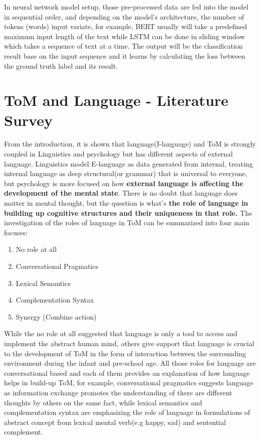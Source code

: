 \documentclass[12pt]{article}
\begin{document}
In neural network model setup, those pre-processed data are fed into the model in sequential order, and depending on the model's architecture,  the number of tokens (words) input variate, for example, BERT usually will take a predefined maximum input length of the text while LSTM can be done in sliding window which takes a sequence of text at a time. The output will be the classification result base on the input sequence and it learns by calculating the loss between the ground truth label and its result.

\newpage
\section{ToM and Language - Literature Survey} 
From the introduction, it is shown that language(I-language) and ToM is strongly coupled in Linguistics and psychology but has different aspects of external language. Linguistics model E-language as data generated from internal, treating internal language as deep structural(or grammar) that is universal to everyone, but psychology is more focused on how \textbf{external language is affecting the development of the mental state}. There is no doubt that language does matter in mental thought, but the question is what's \textbf{the role of language in building up cognitive structures and their uniqueness in that role\cite{Astington_2005}.} The investigation of the roles of language in ToM can be summarized into four main focuses\cite{Astington_2005}:
\begin{enumerate}
    \item No role at all
    \item Conversational Pragmatics
    \item Lexical Semantics
    \item Complementation Syntax
    \item Synergy (Combine action)
\end{enumerate}
While the no role at all suggested that language is only a tool to access and implement the abstract human mind, others give support that language is crucial to the development of ToM in the form of interaction between the surrounding environment during the infant and pre-school age. All those roles for language are conversational based and each of them provides an explanation of how language helps in build-up ToM, for example, conversational pragmatics suggests language as information exchange promotes the understanding of there are different thoughts by others on the same fact, while lexical semantics and complementation syntax are emphasizing the role of language in formulations of abstract concept from lexical mental verb(e.g happy, sad) and sentential complement.
\end{document}
